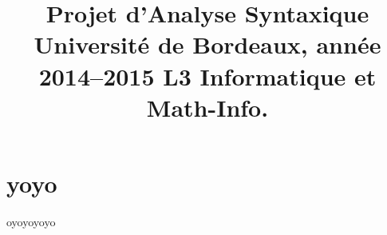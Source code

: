 \documentclass{report}
\title{Projet d’Analyse Syntaxique Université de Bordeaux, année 2014–2015 L3 Informatique et Math-Info.}
\begin{document}
\maketitle
\tableofcontents
\section{yoyo}oyoyoyoyo
\end{document}
